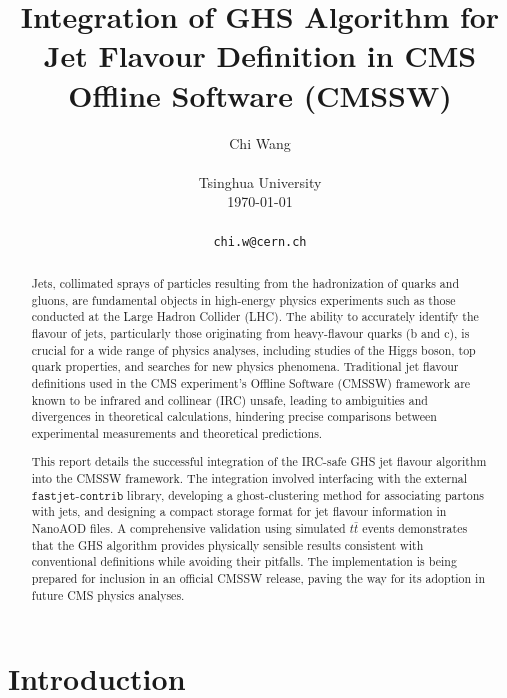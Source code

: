 \documentclass[10pt,twocolumn]{article}
\begin{document}
\title{Integration of GHS Algorithm for Jet Flavour Definition in CMS Offline Software (CMSSW)}

\author{Chi Wang \\
\\
Tsinghua University \\
\today
\\
\\
\texttt{chi.w@cern.ch} \\
}

\maketitle
\thispagestyle{empty}

\begin{abstract}

Jets, collimated sprays of particles resulting from the hadronization of quarks and gluons, are fundamental objects in high-energy physics experiments such as those conducted at the Large Hadron Collider (LHC). The ability to accurately identify the flavour of jets, particularly those originating from heavy-flavour quarks (b and c), is crucial for a wide range of physics analyses, including studies of the Higgs boson, top quark properties, and searches for new physics phenomena. Traditional jet flavour definitions used in the CMS experiment's Offline Software (CMSSW) framework are known to be infrared and collinear (IRC) unsafe, leading to ambiguities and divergences in theoretical calculations, hindering precise comparisons between experimental measurements and theoretical predictions.

This report details the successful integration of the IRC-safe GHS jet flavour algorithm into the CMSSW framework. The integration involved interfacing with the external $\texttt{fastjet-contrib}$ library, developing a ghost-clustering method for associating partons with jets, and designing a compact storage format for jet flavour information in NanoAOD files. A comprehensive validation using simulated $t\bar{t}$ events demonstrates that the GHS algorithm provides physically sensible results consistent with conventional definitions while avoiding their pitfalls. The implementation is being prepared for inclusion in an official CMSSW release, paving the way for its adoption in future CMS physics analyses.

\end{abstract}

\section{Introduction}
\label{sec:intro}
\end{document}
